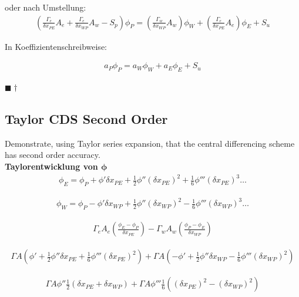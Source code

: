\documentclass[a4paper]{scrartcl}
\newcommand{\qed}{\begin{flushright}
$\blacksquare \dagger$ \end{flushright}}
\begin{document}
oder nach Umstellung:
\begin{align}
\boxed{\left(\frac{\Gamma_e}{\delta x_{PE}}A_e + \frac{\Gamma_e}{\delta
x_{WP}} A_w -S_p\right)\phi_P=\left(\frac{\Gamma_w}{\delta x_{WP}}A_w\right)
\phi_W + \left(\frac{\Gamma_e}{\delta x_{PE}}A_e\right)\phi_E+S_u}
\end{align}

In Koeffizientenschreibweise:

\begin{align}
\boxed{a_P\phi_P=a_W\phi_W+a_E\phi_E+S_u}
\end{align}

\qed
\subsection{Taylor CDS Second Order}
Demonstrate, using Taylor series expansion, that the central differencing scheme
has second order accuracy.\\
\textbf{Taylorentwicklung von $\mathbf{\phi}$} \\

\begin{align}
\boxed{\phi_E=\phi_P+\phi'\delta x_{PE} + \frac{1}{2}\phi''\left(\delta
x_{PE}\right)^2+\frac{1}{6}\phi'''\left(\delta x_{PE}\right)^3\ldots}
\end{align}

\begin{align}
\boxed{\phi_W=\phi_P-\phi'\delta x_{WP} + \frac{1}{2}\phi''\left(\delta
x_{WP}\right)^2-\frac{1}{6}\phi'''\left(\delta x_{WP}\right)^3\ldots}
\end{align}

\begin{align}
\Gamma_e A_e \left(\frac{\phi_E-\phi_P}{\delta x_{PE}}\right)-\Gamma_w A_w
\left(\frac{\phi_P-\phi_E}{\delta x_{WP}}\right)
\end{align}

\begin{align}
\Gamma A \left(\phi' + \frac{1}{2} \phi''\delta
x_{PE}+\frac{1}{6}\phi'''\left(\delta x_{PE}\right)^2\right) + \Gamma A
\left(-\phi'+\frac{1}{2}\phi''\delta x_{WP} - \frac{1}{6} \phi'''
\left(\delta x_{WP}\right)^2\right)
\end{align}

\begin{align}
\Gamma A \phi'' \frac{1}{2} \left(\delta x_{PE} + \delta x_{WP}\right)+
\Gamma A \phi''' \frac{1}{6}
\left(\left(\delta x_{PE}\right)^2 - \left(\delta x_{WP}\right)^2 \right)
\end{align}
\end{document}
